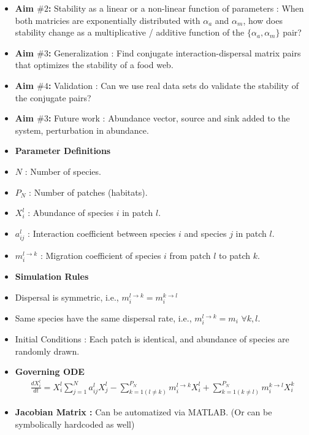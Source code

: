 \documentclass[12pt]{article}
\begin{document}
\begin{itemize}
\item \textbf{Aim $\#2$: } Stability as a linear or a non-linear function of parameters : When both matricies are exponentially distributed with $\alpha_a$ and $\alpha_m$, how does stability change as a multiplicative / additive function of the $\{\alpha_a,\alpha_m\}$ pair?
\item \textbf{Aim $\#3$: } Generalization : Find conjugate interaction-dispersal matrix pairs that optimizes the stability of a food web.
\item \textbf{Aim $\#4$: } Validation : Can we use real data sets do validate the stability of the conjugate pairs?
\item \textbf{Aim $\#3$: } Future work :  Abundance vector, source and sink added to the system, perturbation in abundance.
\item [] \textbf{Parameter Definitions}
\item $N$ : Number of species.
\item $P_N$ : Number of patches (habitats). 
\item $X_{i}^{l}$ : Abundance of species $i$ in patch $l$.
\item $a_{ij}^{l}$ : Interaction coefficient between species $i$ and species $j$ in patch $l$.
\item $m_{i}^{l \rightarrow k}$ : Migration coefficient of species $i$ from patch $l$ to patch $k$.
\item [] \textbf{Simulation Rules}
\item Dispersal is symmetric, i.e.,  $m_{i}^{l \rightarrow k}=m_{i}^{k \rightarrow l}$
\item Same species have the same dispersal rate, i.e., $m_{i}^{l \rightarrow k} = m_{i}\,\, \forall k, l.$
\item Initial Conditions : Each patch is identical, and abundance of species are randomly drawn.
\item \textbf{Governing ODE}
\begin{align}
\frac{dX_{i}^{l}}{dt} = X_{i}^{l}\sum_{j=1}^{N}a_{ij}^{l}X_{j}^{l} - \sum_{k=1 (l \neq k)}^{P_N}m_{i}^{l \rightarrow k} X_{i}^{l}+ \sum_{k=1 (k \neq l)}^{P_N}m_{i}^{k \rightarrow l}X_{i}^{k}
\end{align}
\item \textbf{Jacobian Matrix : }Can be automatized via MATLAB. (Or can be symbolically hardcoded as well)
\end{itemize}
\end{document}
